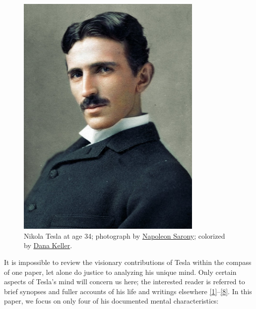 \documentclass[
  12pt,
  british,
  a4paper,
  rgb,
  dvipsnames,
  svgnames,
  hyphens]{article}
\begin{document}
\begin{figure}
\hypertarget{fig:tesla}{%
\centering
\includegraphics[width=0.8\textwidth,height=\textheight]{images/tesla_in_color.jpg}
\caption[Nikola Tesla at age 34; photograph by
\href{https://en.wikipedia.org/wiki/Napoleon_Sarony}{Napoleon Sarony};
colorized by \href{http://www.danarkeller.com/}{Dana Keller}.]{Nikola
Tesla at age 34; photograph by
\href{https://en.wikipedia.org/wiki/Napoleon_Sarony}{Napoleon Sarony};
colorized by \href{http://www.danarkeller.com/}{Dana
Keller}.\footnotemark{}}\label{fig:tesla}
}
\end{figure}

It is impossible to review the visionary contributions of Tesla within
the compass of one paper, let alone do justice to analyzing his unique
mind. Only certain aspects of Tesla's mind will concern us here; the
interested reader is referred to brief synopses and fuller accounts of
his life and writings elsewhere
\protect\hyperlink{ref-john83}{{[}1{]}}--\protect\hyperlink{ref-tesla-pbs-bio}{{[}8{]}}.
In this paper, we focus on only four of his documented mental
characteristics:
\end{document}
